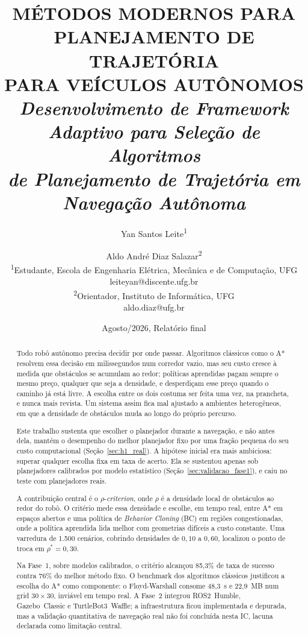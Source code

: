 \documentclass[12pt, a4paper]{article}
\title{
  \textbf{MÉTODOS MODERNOS PARA PLANEJAMENTO DE TRAJETÓRIA \\ PARA VEÍCULOS AUTÔNOMOS} \\[6pt]
  \large\textit{Desenvolvimento de Framework Adaptivo para Seleção de Algoritmos \\
  de Planejamento de Trajetória em Navegação Autônoma}
}
\author{
  Yan Santos Leite\textsuperscript{1} \and
  Aldo André Diaz Salazar\textsuperscript{2} \\[4pt]
  \small\textsuperscript{1}Estudante, Escola de Engenharia Elétrica, Mecânica e de Computação, UFG \\
  \small leiteyan@discente.ufg.br \\[2pt]
  \small\textsuperscript{2}Orientador, Instituto de Informática, UFG \\
  \small aldo.diaz@ufg.br
}
\date{Agosto/2026, Relatório final}
\begin{document}
\vspace{-1.5cm}
\maketitle
\vspace{-1.2cm}
\thispagestyle{fancy}

\begin{abstract}
Todo robô autônomo precisa decidir por onde passar. Algoritmos clássicos como o A* resolvem essa
decisão em milissegundos num corredor vazio, mas seu custo cresce à medida que obstáculos se
acumulam ao redor; políticas aprendidas pagam sempre o mesmo preço, qualquer que seja a densidade,
e desperdiçam esse preço quando o caminho já está livre. A escolha entre os dois costuma ser
feita uma vez, na prancheta, e nunca mais revista. Um sistema assim fica mal ajustado a ambientes
heterogêneos, em que a densidade de obstáculos muda ao longo do próprio percurso.

Este trabalho sustenta que escolher o planejador durante a navegação, e não antes dela, mantém o
desempenho do melhor planejador fixo por uma fração pequena do seu custo computacional
(Seção~\ref{sec:h1_real}). A hipótese inicial era mais ambiciosa: superar qualquer escolha fixa
em taxa de acerto. Ela se sustentou apenas sob planejadores calibrados por modelo estatístico
(Seção~\ref{sec:validacao_fase1}), e caiu no teste com planejadores reais.

A contribuição central é o $\rho$-\textit{criterion}, onde $\rho$ é a densidade local de
obstáculos ao redor do robô. O critério mede essa densidade e escolhe, em tempo real, entre A* em
espaços abertos e uma política de \textit{Behavior Cloning} (BC) em regiões congestionadas, onde
a política aprendida lida melhor com geometrias difíceis a custo constante. Uma varredura de
1.500 cenários, cobrindo densidades de $0{,}10$ a $0{,}60$, localizou o ponto de troca em
$\rho^* = 0{,}30$.

Na Fase~1, sobre modelos calibrados, o critério alcançou 85,3\% de taxa de sucesso contra 76\% do
melhor método fixo. O benchmark dos algoritmos clássicos justificou a escolha do A* como
componente: o Floyd-Warshall consome 48,3~s e 22,9~MB num grid $30{\times}30$, inviável em tempo
real. A Fase~2 integrou ROS2~Humble, Gazebo~Classic e TurtleBot3~Waffle; a infraestrutura ficou
implementada e depurada, mas a validação quantitativa de navegação real não foi concluída nesta
IC, lacuna declarada como limitação central.


\end{abstract}
\end{document}
